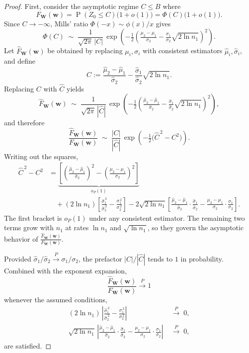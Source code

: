 \documentclass[12pt]{article}
\DeclareMathOperator*{\Prob}{P}
\begin{document}
\begin{proof}
First, consider the asymptotic regime $C \leq B$ where
$$
F_{\mathbf W}(\mathbf w) = \Prob(Z_0 \le C)\bigl(1+o(1)\bigr)
  = \Phi(C)\bigl(1+o(1)\bigr).
$$
Since $C \to -\infty$, Mills' ratio $\Phi(-x)\sim \phi(x)/x$ gives
$$
\Phi(C) \;\sim\; \frac{1}{\sqrt{2\pi}\,|C|}\,
\exp\!\left(-\tfrac{1}{2}\!\left(\tfrac{\mu_2-\mu_1}{\sigma_2} - \tfrac{\sigma_1}{\sigma_2}\sqrt{2\ln n_1}\right)^{\!2}\right).
$$
Let $\widehat F_{\mathbf W}(\mathbf w)$ be obtained by replacing $\mu_i,\sigma_i$ with consistent estimators $\hat\mu_i,\hat\sigma_i$, and define
$$
\widehat C := \frac{\hat\mu_2-\hat\mu_1}{\hat\sigma_2} - \frac{\hat\sigma_1}{\hat\sigma_2}\sqrt{2\ln n_1}.
$$
Replacing $C$ with $\widehat C$ yields
$$
\widehat F_{\mathbf W}(\mathbf w) \;\sim\; \frac{1}{\sqrt{2\pi}\,|\widehat C|}\,
\exp\!\left(-\tfrac{1}{2}\!\left(\tfrac{\hat\mu_2-\hat\mu_1}{\hat\sigma_2} - \tfrac{\hat\sigma_1}{\hat\sigma_2}\sqrt{2\ln n_1}\right)^{\!2}\right),
$$
and therefore
$$
\frac{\widehat F_{\mathbf W}(\mathbf w)}{F_{\mathbf W}(\mathbf w)} 
\;\sim\; \frac{|C|}{|\widehat C|}\,
\exp\!\left(-\tfrac{1}{2}\bigl(\widehat C^{\,2} - C^{2}\bigr)\right).
$$
Writing out the squares,
\begin{align*}
\widehat C^{\,2} - C^{2}
&= \underbrace{\left[\left(\tfrac{\hat\mu_2-\hat\mu_1}{\hat\sigma_2}\right)^2
-
\left(\tfrac{\mu_2-\mu_1}{\sigma_2}\right)^2\right]}_{o_P(1)} \\[4pt]
&\quad + (2\ln n_1)\!\left[\frac{\hat\sigma_1^{\,2}}{\hat\sigma_2^{\,2}} - \frac{\sigma_1^{\,2}}{\sigma_2^{\,2}}\right] 
- 2\sqrt{2\ln n_1}\!\left[\frac{\hat\mu_2-\hat\mu_1}{\hat\sigma_2}\cdot\frac{\hat\sigma_1}{\hat\sigma_2} - \frac{\mu_2-\mu_1}{\sigma_2}\cdot\frac{\sigma_1}{\sigma_2}\right].
\end{align*}
The first bracket is $o_P(1)$ under any consistent estimator. The remaining two terms grow with $n_1$ at rates $\ln n_1$ and $\sqrt{\ln n_1}$, so they govern the asymptotic behavior of $\frac{\widehat F_{\mathbf W}(\mathbf w)}{F_{\mathbf W}(\mathbf w)} $.


Provided $\hat\sigma_1/\hat\sigma_2\xrightarrow{P}\sigma_1/\sigma_2$, the prefactor $|C|/|\widehat C|$ tends to $1$ in probability. Combined with the exponent expansion, 
$$
  \frac{\widehat F_{\mathbf W}(\mathbf w)}{F_{\mathbf W}(\mathbf w)} \xrightarrow{P}1
$$ 
whenever the assumed conditions,
\begin{align*}
(2\ln n_1)\,\left|\frac{\hat\sigma_1^{\,2}}{\hat\sigma_2^{\,2}} - \frac{\sigma_1^{\,2}}{\sigma_2^{\,2}}\right| 
&\;\xrightarrow{\;P\;}\; 0, \\[4pt]
\sqrt{2\ln n_1}\,\left|\frac{\hat\mu_2-\hat\mu_1}{\hat\sigma_2}\cdot\frac{\hat\sigma_1}{\hat\sigma_2} - \frac{\mu_2-\mu_1}{\sigma_2}\cdot\frac{\sigma_1}{\sigma_2}\right| 
&\;\xrightarrow{\;P\;}\; 0, 
\end{align*}
are satisfied. 


\end{proof}
\end{document}
